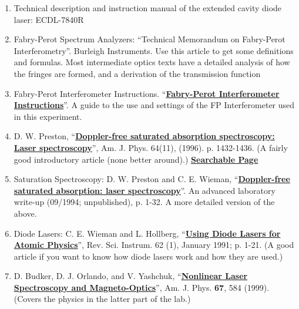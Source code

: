 \documentclass{../lab}
\begin{document}
\begin{enumerate}
    \item Technical description and instruction manual of the extended cavity diode laser: ECDL-7840R

    \item Fabry-Perot Spectrum Analyzers: ``Technical Memorandum on Fabry-Perot Interferometry''. Burleigh Instruments. Use this article to get some definitions and formulas. Most intermediate optics texts have a detailed analysis of how the fringes are formed, and a derivation of the transmission function

    \item Fabry-Perot Interferometer Instructions. ``\href{http://physics111.lib.berkeley.edu/Physics111/Reprints/MNO/Fabry-Perot\_Instructions\_OCR.pdf}{\textbf{Fabry-Perot Interferometer Instructions}}''. A guide to the use and settings of the FP Interferometer used in this experiment.

    \item D. W. Preston, ``\href{http://ajp.aapt.org/resource/1/ajpias/v64/i11/p1432\_s1}{\textbf{Doppler-free saturated absorption spectroscopy: Laser spectroscopy}}'', Am. J. Phys. 64(11), (1996). p. 1432-1436. (A fairly good introductory article (none better around).) \href{http://physics111.lib.berkeley.edu/Physics111/Reprints/MNO/03-Doppler\_Free\_Saturated\_Absoprtion.pdf}{\textbf{Searchable Page}}

    \item Saturation Spectroscopy: D. W. Preston and C. E. Wieman, ``\href{http://physics111.lib.berkeley.edu/Physics111/Reprints/MNO/04-Doppler\_Free\_Saturated\_Absoprtion.pdf}{\textbf{Doppler-free saturated absorption: laser spectroscopy}}''. An advanced laboratory write-up (09/1994; unpublished), p. 1-32. A more detailed version of the above.

    \item Diode Lasers: C. E. Wieman and L. Hollberg, ``\href{http://physics111.lib.berkeley.edu/Physics111/Reprints/MNO/07-Using_Diode_Lasers.pdf}{\textbf{Using Diode Lasers for Atomic Physics}}'', Rev. Sci. Instrum. 62 (1), January 1991; p. 1-21. (A good article if you want to know how diode lasers work and how they are used.)

    \item D. Budker, D. J. Orlando, and V. Yashchuk, ``\href{http://physics111.lib.berkeley.edu/Physics111/Reprints/MNO/01-Nonlinear_Laser_Spectroscopy.pdf}{\textbf{Nonlinear Laser Spectroscopy and Magneto-Optics}}'', Am. J. Phys. \textbf{67}, 584 (1999). (Covers the physics in the latter part of the lab.)


\end{enumerate}
\end{document}
